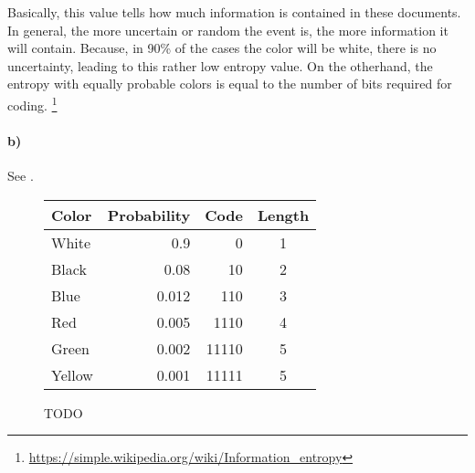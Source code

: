 \documentclass[a4paper,twocolumn]{article}
\begin{document}
	Basically, this value tells how much information is contained in these documents. In general, the more uncertain or random the event is, the more information it will contain. Because, in 90\% of the cases the color will be white, there is no uncertainty, leading to this rather low entropy value. On the otherhand, the entropy with equally probable colors is equal to the number of bits required for coding. \footnote{\url{https://simple.wikipedia.org/wiki/Information_entropy}}
	
	\vspace{12pt}
	
	\begin{comment}
		Very intuitive example from "Simple Wikipedia":
		
		Let's look at an example. If someone is told something they already know, the information they get is very small. It will be pointless for them to be told something they already know. This information would have very low entropy.
		
		If they were told about something they knew little about, they would get much new information. This information would be very valuable to them. They would learn something. This information would have high entropy.
	\end{comment}
	
	\paragraph{b)} %
	See .
	\begin{figure*}[t]
		\begin{minipage}{0.45\textwidth}
		\end{minipage}
		\hfill
		\begin{minipage}{0.45\textwidth}
			\begin{tabular}{l r r c}
				\textbf{Color} & \textbf{Probability} & \textbf{Code} & \textbf{Length}\\
				\hline
				White & 0.9 & 0 & 1 \\
				Black & 0.08 & 10 & 2 \\
				Blue & 0.012 & 110 & 3 \\
				Red & 0.005 & 1110 & 4 \\
				Green & 0.002 & 11110 & 5 \\
				Yellow & 0.001 & 11111 & 5
			\end{tabular}
		\end{minipage}
		\caption{TODO}
		\label{fig:huffman_code}
	\end{figure*}
	
\end{document}
